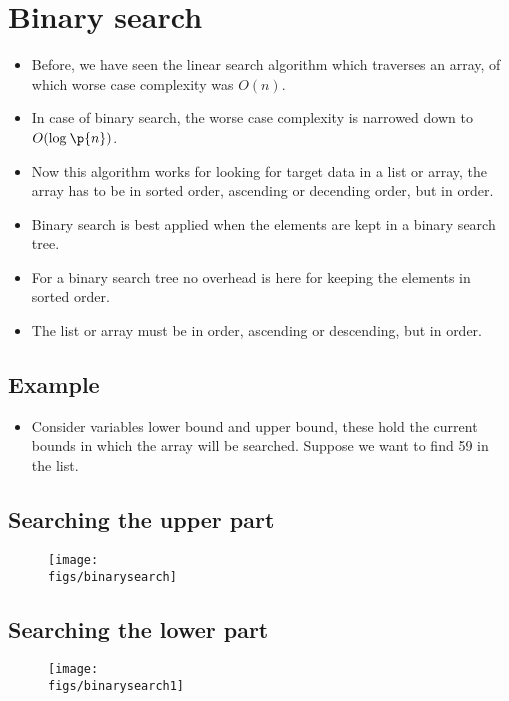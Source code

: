 \section{Binary search}
\begin{itemize}
    \item Before, we have seen the linear search algorithm which traverses an array, of which worse case complexity was $O(n)$.
    \item In case of binary search, the worse case complexity is narrowed down to $O(\log_{}\p{ n } )$.
    \item Now this algorithm works for looking for target data in a list or array, the array has to be in sorted order, ascending or decending order, but in order.
    \item Binary search is best applied when the elements are kept in a binary search tree. 
    \item For a binary search tree no overhead is here for keeping the elements in sorted order. 
    \item The list or array must be in order, ascending or descending, but in order. 
\end{itemize}

\subsection{Example}
\begin{itemize}
    \item Consider variables lower bound and upper bound, these hold the current bounds in which the array will be searched. Suppose we want to find 59 in the list.
\end{itemize}

\subsection{Searching the upper part}
\begin{figure}[H]
    \centering
    \texttt{[image: \\figs/binarysearch]}
\end{figure}

\subsection{Searching the lower part}
\begin{figure}[H]
    \centering
    \texttt{[image: \\figs/binarysearch1]} 
\end{figure}

